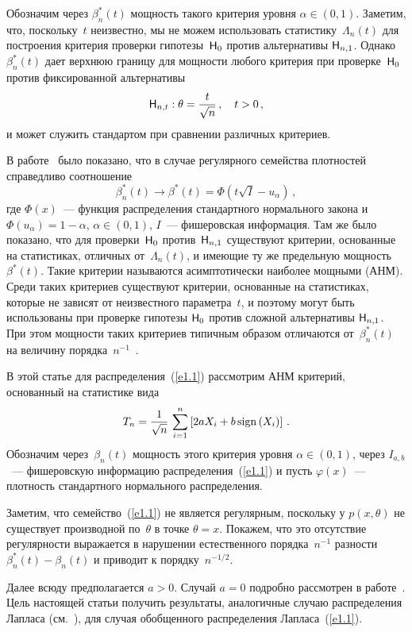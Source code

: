 \begin{multicols}{2}
Обозначим через $\beta_n^*(t)$ мощность такого критерия уровня
$\alpha\in (0,1)$. Заметим, что, поскольку~$t$ неизвестно, мы
не можем использовать статистику~$\Lambda_n(t)$ для построения
критерия проверки гипотезы~${\sf H}_0$ против альтернативы ${\sf
H}_{n,1}$. Однако~$\beta_n^*(t)$ дает верхнюю границу для мощности
любого критерия при проверке~${\sf H}_0$ против фиксированной альтернативы
$$
{\sf H}_{n,t}: \theta = \displaystyle\frac{\displaystyle t\mathstrut}{\displaystyle \sqrt{n}\mathstrut}\,,\quad  t > 0\,,
$$
и может служить стандартом при сравнении различных критериев.

В работе~\cite{1be} было показано, что в  случае регулярного семейства плотностей
справедливо соотношение
$$
\beta_n^*(t) \to \beta^*(t) = \Phi(t\sqrt{I} - u_\alpha)\,,
$$
где $\Phi(x)$~--- функция распределения стандартного нормального закона и
$\Phi(u_\alpha) = 1 - \alpha$, $\alpha \in (0, 1)$, $I$~--- фишеровская информация.
Там же было показано, что для проверки~${\sf H}_0$
против~${\sf H}_{n,1}$ существуют критерии, основанные
на статистиках, отличных от~$\Lambda_n(t)$, и имеющие
ту же предельную мощность~$\beta^*(t)$.
Такие критерии называются асимптотически наиболее мощными (АНМ).
Среди таких критериев существуют критерии, основанные на
статистиках, которые не зависят
от неизвестного параметра~$t$, и поэтому могут быть использованы
при проверке гипотезы ${\sf H}_0$ против сложной альтернативы ${\sf H}_{n,1}$.
При этом мощности таких критериев типичным образом  отличаются от~$\beta_n^*(t)$ на
величину порядка~$n^{-1}$~\cite{1be}.

В этой статье для распределения~(\ref{e1.1})  рассмотрим  АНМ критерий, основанный
на статистике вида
\begin{equation*}
T_{n} =\displaystyle\frac{\displaystyle 1\mathstrut}{\displaystyle \sqrt{n} \mathstrut}\, \sum_{i=1}^{n}\left[2a X_{i} + b\, \mathrm{sign}\left(X_{i} \right)\right]\,. 
\end{equation*}
Обозначим через~$\beta_n(t)$ мощность этого критерия
уровня $\alpha\in(0,1)$,  через $I_{a,b}$~---
фишеровскую информацию распределения~(\ref{e1.1}) и пусть $\varphi(x)$~---
плотность стандартного нормального распределения.

Заметим, что семейство~(\ref{e1.1}) не является регулярным, поскольку у $p(x, \theta)$ 
не существует производной по~$\theta$ в точке $\theta = x$.
Покажем, что это отсутствие регулярности выражается в нарушении
естественного порядка~$n^{-1}$ разности $\beta_n^*(t) - \beta_n(t)$
и приводит к порядку~$n^{-1/2}$.

Далее всюду предполагается $a>0$. Случай   $a = 0$
подробно рассмотрен в работе~\cite{6be}. Цель настоящей статьи получить
результаты, аналогичные случаю распределения Лапласа (см.~\cite{6be}), для
случая обобщенного распределения Лапласа~(\ref{e1.1}).


\end{multicols}
